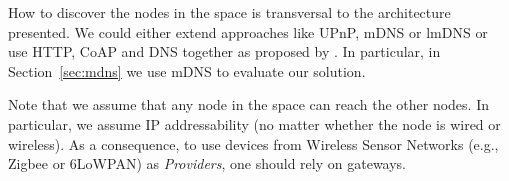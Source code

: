 How to discover the nodes in the space is transversal to the architecture presented.
We could either extend approaches like UPnP, mDNS or lmDNS \citep{jara_light-weight_2012} or use HTTP, CoAP and DNS together as proposed by \citet{ishaq_facilitating_2012}.
In particular, in Section~\ref{sec:mdns} we use mDNS to evaluate our solution.

Note that we assume that any node in the space can reach the other nodes.
In particular, we assume IP addressability (no matter whether the node is wired or wireless).
As a consequence, to use devices from Wireless Sensor Networks (e.g., Zigbee or 6LoWPAN) as \emph{Providers}, one should rely on gateways.



%
%


